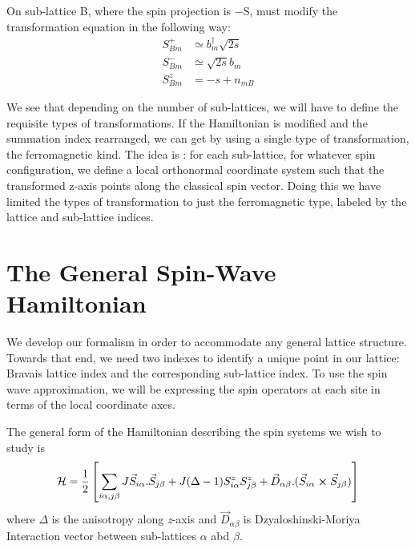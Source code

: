 On sub-lattice B, where the spin projection is $ \mathrm{-S} $, must modify the transformation equation in the following way:
\begin{equation}\label{eq28}
\begin{split}
S^+_{Bm} &\simeq b_m^\dagger\sqrt{2s}\\
S^-_{Bm} &\simeq  \sqrt{2s}b_m\\
S^z_{Bm} &= -s + n_{mB}
\end{split}
\end{equation}

We see that depending on the number of sub-lattices, we will have to define the requisite types of transformations. If the Hamiltonian is modified and the summation index rearranged, we can get by using a single type of transformation, the ferromagnetic kind. The idea is : for each sub-lattice, for whatever spin configuration, we define a local orthonormal coordinate system such that the transformed z-axis points along the classical spin vector. Doing this we have limited the types of transformation to just the ferromagnetic type, labeled by the lattice and sub-lattice indices. 

\section{The General Spin-Wave Hamiltonian}

We develop our formalism in order to accommodate any general lattice structure. Towards that end, we need two indexes to identify a unique point in our lattice: Bravais lattice index and the corresponding sub-lattice index. To use the spin wave approximation, we will be expressing the spin operators at each site in terms of the local coordinate axes. 

The general form of the Hamiltonian describing the spin systems we wish to study is
\begin{equation}
\mathcal{H} = \frac{1}{2}\left[ \sum_{i\alpha,j\beta}^{}J\vec{S}_{i\alpha}.\vec{S}_{j\beta} + J(\Delta - 1)S_{i\alpha}^zS_{j\beta}^z  + \vec{D}_{\alpha \beta} . (\vec{S}_{i\alpha} \cross \vec{S}_{j\beta}) \right]
\end{equation}
where $\Delta$ is the anisotropy along \textit{z}-axis and $\vec{D}_{\alpha \beta}$ is Dzyaloshinski-Moriya Interaction vector between sub-lattices $\alpha$ abd $\beta$.

